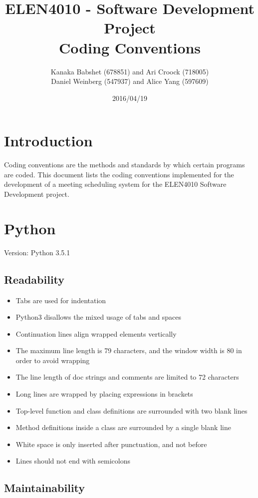 \documentclass[11pt, a4paper]{article}
\title{ELEN4010 - Software Development Project \\ Coding Conventions}
\author{Kanaka Babshet (678851) and Ari Croock (718005)\\Daniel Weinberg (547937) and Alice Yang (597609)}
\date{2016/04/19}
\begin{document}
	\maketitle
	\tableofcontents
	\newpage
	\noindent
	\section{Introduction}
	Coding conventions are the methods and standards by which certain programs are coded. This document lists the coding conventions implemented for the development of a meeting scheduling system for the ELEN4010 Software Development project. 
\section{Python}
Version: Python 3.5.1
\subsection{Readability}
\begin{itemize}
	\item Tabs are used for indentation 
	\item Python3 disallows the mixed usage of tabs and spaces
	\item Continuation lines align wrapped elements vertically 
	\item The maximum line length is 79 characters, and the window width is 80 in order to avoid wrapping
	\item The line length of doc strings and comments are limited to 72 characters
	\item Long lines are wrapped by placing expressions in brackets
	\item Top-level function and class definitions are surrounded with two blank lines
	\item Method definitions inside a class are surrounded by a single blank line
	\item White space is only inserted after punctuation, and not before
	\item Lines should not end with semicolons
\end{itemize}

\subsection{Maintainability}
\end{document}
